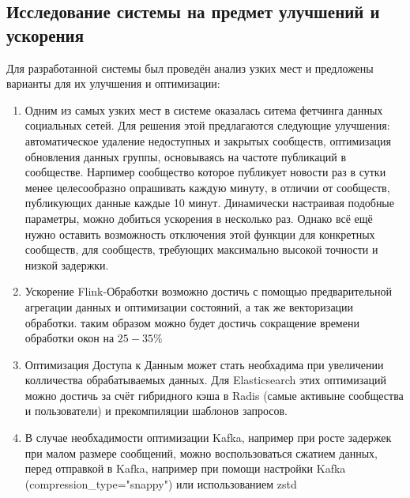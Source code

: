     \subsection{Исследование системы на предмет улучшений и ускорения}
        Для разработанной системы был проведён анализ узких мест и предложены варианты для их улучшения и оптимизации:
        \begin{enumerate}
            \item Одним из самых узких мест в системе оказалась ситема фетчинга данных социальных сетей. Для решения этой предлагаются следующие улучшения: автоматическое удаление недоступных и закрытых сообществ, оптимизация обновления данных группы, основываясь на частоте публикаций в сообществе. Нарпимер сообщество которое публикует новости раз в сутки менее целесообразно опрашивать каждую минуту, в отличии от сообществ, публикующих данные каждые 10 минут. Динамически настраивая подобные параметры, можно добиться ускорения в несколько раз. Однако всё ещё нужно оставить возможность отключения этой функции для конкретных сообществ, для сообществ, требующих максимально высокой точности и низкой задержки.
            \item Ускорение Flink-Обработки возможно достичь с помощью предварительной агрегации данных и оптимизации состояний, а так же векторизации обработки. таким образом можно будет достичь сокращение времени обработки окон на $25-35\%$ 
            \item Оптимизация Доступа к Данным может стать необхадима при увеличении колличества обрабатываемых данных. Для Elasticsearch этих оптимизаций можно достичь за счёт гибридного кэша в Radis (самые активыне сообщества и пользователи) и прекомпиляции шаблонов запросов.
            \item В случае необхадимости оптимизации Kafka, например при росте задержек при малом размере сообщений, можно воспользоваться сжатием данных, перед отправкой в Kafka, например при помощи настройки Kafka (compression\_type="snappy") или использованием zstd
        \end{enumerate}
        
\newpage
